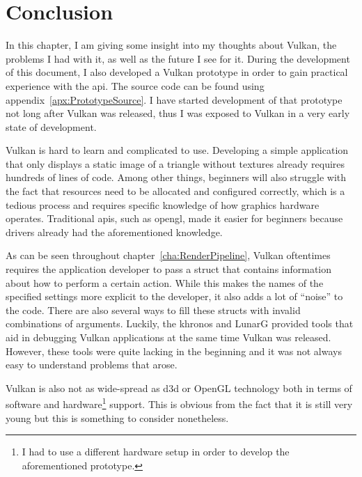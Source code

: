 
\chapter{Conclusion}
\label{cha:Conclusion}

  In this chapter, I am giving some insight into my thoughts about Vulkan, the problems I had with it, as well as the future I see for it.
  During the development of this document, I also developed a Vulkan prototype in order to gain practical experience with the \gls{api}.
  The source code can be found using appendix~\ref{apx:PrototypeSource}.
  I have started development of that prototype not long after Vulkan was released, thus I was exposed to Vulkan in a very early state of development.

  Vulkan is hard to learn and complicated to use.
  Developing a simple application that only displays a static image of a triangle without textures already requires hundreds of lines of code.
  Among other things, beginners will also struggle with the fact that resources need to be allocated and configured correctly, which is a tedious process and requires specific knowledge of how graphics hardware operates.
  Traditional \glspl{api}, such as \gls{opengl}, made it easier for beginners because drivers already had the aforementioned knowledge.

  As can be seen throughout chapter~\ref{cha:RenderPipeline}, Vulkan oftentimes requires the application developer to pass a struct that contains information about how to perform a certain action.
  While this makes the names of the specified settings more explicit to the developer, it also adds a lot of ``noise'' to the code.
  There are also several ways to fill these structs with invalid combinations of arguments.
  Luckily, the \gls{khronos} and LunarG provided tools that aid in debugging Vulkan applications at the same time Vulkan was released.
  However, these tools were quite lacking in the beginning and it was not always easy to understand problems that arose.

  Vulkan is also not as wide-spread as \gls{d3d} or OpenGL technology both in terms of software and hardware\footnote{I had to use a different hardware setup in order to develop the aforementioned prototype.} support.
  This is obvious from the fact that it is still very young but this is something to consider nonetheless.

